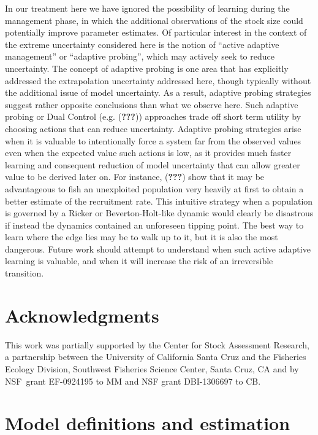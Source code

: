 \documentclass[author-year, review]{elsarticle} %
\begin{document}
In our treatment here we have ignored the possibility of learning during
the management phase, in which the additional observations of the stock
size could potentially improve parameter estimates. Of particular
interest in the context of the extreme uncertainty considered here is
the notion of ``active adaptive management'' or ``adaptive probing'',
which may actively seek to reduce uncertainty. The concept of adaptive
probing is one area that has explicitly addressed the extrapolation
uncertainty addressed here, though typically without the additional
issue of model uncertainty. As a result, adaptive probing strategies
suggest rather opposite conclusions than what we observe here. Such
adaptive probing or Dual Control (e.g. ({\textbf{???}})) approaches
trade off short term utility by choosing actions that can reduce
uncertainty. Adaptive probing strategies arise when it is valuable to
intentionally force a system far from the observed values even when the
expected value such actions is low, as it provides much faster learning
and consequent reduction of model uncertainty that can allow greater
value to be derived later on. For instance, ({\textbf{???}}) show that
it may be advantageous to fish an unexploited population very heavily at
first to obtain a better estimate of the recruitment rate. This
intuitive strategy when a population is governed by a Ricker or
Beverton-Holt-like dynamic would clearly be disastrous if instead the
dynamics contained an unforeseen tipping point. The best way to learn
where the edge lies may be to walk up to it, but it is also the most
dangerous. Future work should attempt to understand when such active
adaptive learning is valuable, and when it will increase the risk of an
irreversible transition.

\section{Acknowledgments}\label{acknowledgments}

This work was partially supported by the Center for Stock Assessment
Research, a partnership between the University of California Santa Cruz
and the Fisheries Ecology Division, Southwest Fisheries Science Center,
Santa Cruz, CA and by NSF~grant EF-0924195 to MM and NSF grant
DBI-1306697 to CB.

\appendix

\section{Model definitions and
estimation}\label{model-definitions-and-estimation}
\end{document}
